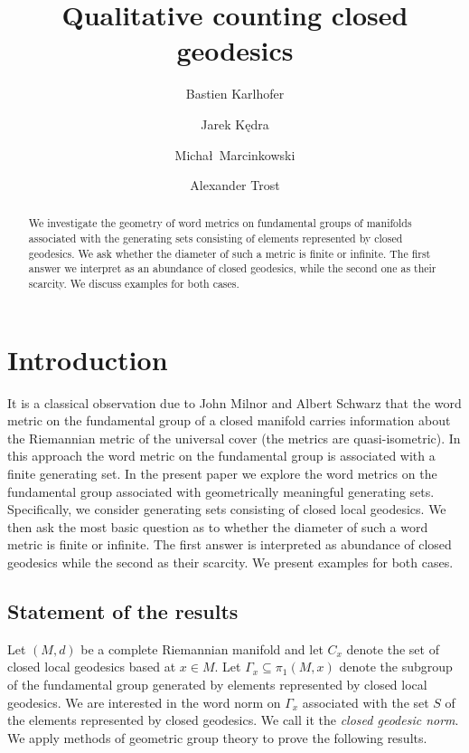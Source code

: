 \documentclass[12pt]{amsart}
\theoremstyle{definition}
\theoremstyle{remark}
\numberwithin{figure}{section}
\numberwithin{table}{section}
\numberwithin{equation}{section}
\begin{document}
\title{Qualitative counting closed geodesics}
\author[Karlhofer]{Bastien Karlhofer}
\address{BK: University of Aberdeen}
\author[K\k{e}dra]{Jarek K\k{e}dra}
\address{JK: University of Aberdeen and University of Szczecin}
\author[Marcinkowski]{Micha\l\ Marcinkowski}
\address{MM: Uniwersytet Wroc\l awski}
\author[Trost]{Alexander Trost}
\address{AT: University of Aberdeen}


\begin{abstract}

We investigate the geometry of word metrics on fundamental groups of manifolds
associated with the generating sets consisting of elements represented by
closed geodesics. We ask whether the diameter of such a metric is finite or
infinite. The first answer we interpret as an abundance of closed geodesics,
while the second one as their scarcity. We discuss examples for both cases.

\end{abstract}



\maketitle
\section{Introduction}
It is a classical observation due to John Milnor \cite{MR0232311} and Albert
Schwarz \cite{MR0075634} that the word metric on the fundamental group of a
closed manifold carries information about the Riemannian metric of the
universal cover (the metrics are quasi-isometric).  In this approach the word
metric on the fundamental group is associated with a finite generating set.
In the present paper we explore the word metrics on the fundamental group
associated with geometrically meaningful generating sets. Specifically, we
consider generating sets consisting of closed local geodesics.  We then ask the
most basic question as to whether the diameter of such a word metric is finite
or infinite. The first answer is interpreted as abundance of closed geodesics
while the second as their scarcity.  We present examples for both cases.


\subsection{Statement of the results}
Let $(M,d)$ be a complete Riemannian manifold and let $C_x$ denote the set of
closed local geodesics based at $x\in M$.  Let $\Gamma_x \subseteq \pi_1(M,x)$
denote the subgroup of the fundamental group generated by elements represented
by closed local geodesics. We are interested in the word norm on $\Gamma_x$
associated with the set $S$ of the elements represented by closed geodesics.
We call it the {\em closed geodesic norm}. We apply methods of geometric group
theory to prove the following results.
\end{document}
